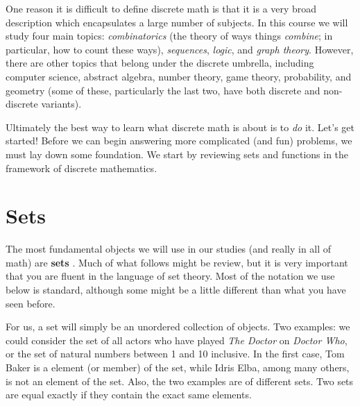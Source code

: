 \documentclass[10pt,]{book}
\newcommand{\terminology}[1]{\textbf{#1}}
\theoremstyle{plain}
\theoremstyle{definition}
\theoremstyle{definition}
\theoremstyle{definition}
\numberwithin{equation}{section}
\begin{document}
    One reason it is difficult to define discrete math is that it is a very broad description which encapsulates a large number of subjects. In this course we will study four main topics: \emph{combinatorics} (the theory of ways things \emph{combine};
    in particular, how to count these ways), \emph{sequences}, \emph{logic}, and \emph{graph theory}. However, there are other topics that belong under the discrete umbrella, including computer science, abstract algebra, number theory, game theory,
    probability, and geometry (some of these, particularly the last two, have both discrete and non-discrete variants).
\par

    Ultimately the best way to learn what discrete math is about is to \emph{do} it. Let's get started! Before we can begin answering more complicated (and fun) problems, we must lay down some foundation. We start by reviewing sets and functions in
    the framework of discrete mathematics.
\typeout{************************************************}
\typeout{************************************************}
\section[Sets]{Sets}\label{sec_intro-sets}
\typeout{************************************************}
\typeout{************************************************}

      The most fundamental objects we will use in our studies (and really in all of math) are
      \terminology{sets}
      . Much of what follows might be review, but it is very important that you are fluent in the language of set theory. Most of the notation we use below is standard, although some might be a little different than what you have seen before.
\par

      For us, a set will simply be an unordered collection of objects. Two examples: we could consider the set of all actors who have played \emph{The Doctor} on \emph{Doctor Who}, or the
      set of natural numbers between 1 and 10 inclusive. In the first case, Tom Baker is a element (or member) of the set, while Idris Elba, among many others, is not an element of the set. Also, the two examples are of different sets. Two sets are equal
      exactly if they contain the exact same elements.
\typeout{************************************************}
\typeout{************************************************}
\end{document}
